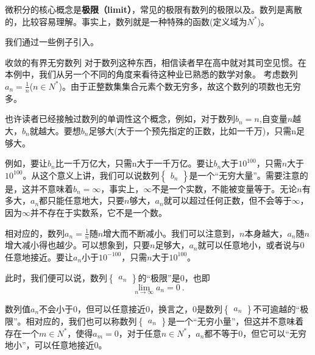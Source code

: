 
微积分的核心概念是\textbf{极限（limit）}，常见的极限有数列的极限以及。数列是离散的，比较容易理解。事实上，数列就是一种特殊的函数(定义域为$N^{*}$)。

我们通过一些例子引入。

\begin{example}{收敛的有界无穷数列}\label{ex_Lim0_1}
对于数列这种东西，相信读者早在高中就对其司空见惯。在本例中，我们从另一个不同的角度来看待这种业已熟悉的数学对象。
考虑数列 $ a_n= \frac {1}{n} $($n \in N^{*}$)。由于正整数集集合元素个数无穷多，故这个数列的项数也无穷多。

也许读者已经接触过数列的单调性这个概念，例如，对于数列$ b_n= n$,自变量$n$越大，$b_n$就越大。要想$b_n$足够大(大于一个预先指定的正数，比如一千万)，只需n足够大。

例如，要让$b_n$比一千万亿大，只需n大于一千万亿。要让$b_n$大于$10^{100}$，只需$n$大于$10^{100}$。从这个意义上讲，我们可以说数列$\begin{Bmatrix} b_n \end{Bmatrix}$是一个“无穷大量”。需要注意的是，这并不意味着$b_n = \infty $，事实上，$\infty$不是一个实数，不能被变量等于。无论$n$有多大，$a_n$都只能任意地大，只要$n$够大，$a_n$就可以超过任何正数，但不会等于$\infty$，因为$\infty$并不存在于实数系，它不是一个数。

相对应的，数列$ a_n= \frac {1}{n} $随$n$增大而不断减小。我们可以注意到，$n$本身越大，$a_n$随$n$增大减小得也越少。可以想象到，只要$n$足够大，$a_n$就可以任意地小，或者说与$0$任意地接近。要让$ a_n $小于$10^{-100}$，只需$n$大于$10^{100}$。

此时，我们便可以说，数列$\begin{Bmatrix} a_n \end{Bmatrix}$的“极限”是0，也即
\begin{equation}\label{eq_Lim0_8}
\lim_{n \to \infty } {a_n} = 0 ~.
\end{equation}

数列值$  a_n  $不会小于$0$，但可以任意接近$0$，换言之，$0$是数列$\begin{Bmatrix} a_n \end{Bmatrix}$不可逾越的“极限”。相对应的，我们也可以称数列$\begin{Bmatrix} a_n \end{Bmatrix}$是一个“无穷小量”，但这并不意味着存在一个$m \in N^{*}$，使得$a_m = 0$，对于任意$n \in N^{*}$，$a_n $都不等于0，但它可以“无穷地小”，可以任意地接近$0$。


\end{example}


